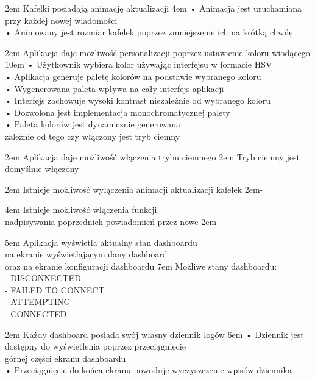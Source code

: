 {2em}{
    Kafelki posiadają animację aktualizacji
}
{4em}{
    • Animacja jest uruchamiana przy każdej nowej wiadomości\\
    • Animowany jest rozmiar kafelek poprzez zmniejszenie ich na krótką chwilę
}

{2em}{
    Aplikacja daje możliwość personalizacji poprzez ustawienie koloru wiodącego
}
{10em}{
    • Użytkownik wybiera kolor używając interfejsu w formacie HSV\\
    • Aplikacja generuje paletę kolorów na podstawie wybranego koloru\\
    • Wygenerowana paleta wpływa na cały interfejs aplikacji\\
    • Interfejs zachowuje wysoki kontrast niezależnie od wybranego koloru\\
    • Dozwolona jest implementacja monochromatycznej palety\\
    • Paleta kolorów jest dynamicznie generowana\\
    \hspace*{0.5em} zależnie od tego czy włączony jest tryb ciemny
}

{2em}{
    Aplikacja daje możliwość włączenia trybu ciemnego
}
{2em}{
    Tryb ciemny jest domyślnie włączony
}

{2em}{
    Istnieje możliwość wyłączenia animacji aktualizacji kafelek
}
{2em}{-}

{4em}{
    Istnieje możliwość włączenia funkcji\\
    nadpisywania poprzednich powiadomień przez nowe
}
{2em}{-}

{5em}{
    Aplikacja wyświetla aktualny stan dashboardu\\
    na ekranie wyświetlającym dany dashboard\\
    oraz na ekranie konfiguracji dashboardu
}
{7em}{
    Możliwe stany dashboardu:\\
    - DISCONNECTED\\
    - FAILED TO CONNECT\\
    - ATTEMPTING\\
    - CONNECTED
}

{2em}{
    Każdy dashboard posiada swój własny dziennik logów
}
{6em}{
    • Dziennik jest dostępny do wyświetlenia poprzez przeciągnięcie\\
    \hspace*{0.5em} górnej części ekranu dashboardu\\

    • Przeciągnięcie do końca ekranu powoduje wyczyszczenie wpisów dziennika
}

